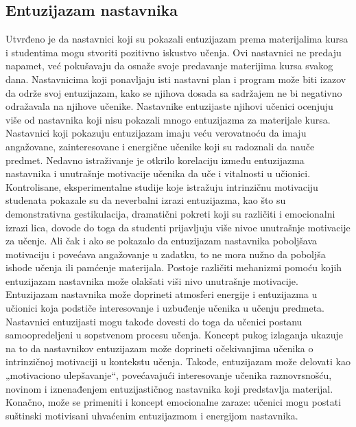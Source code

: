 \documentclass[a4paper]{article}
\begin{document}
\newpage
\subsection{Entuzijazam nastavnika}
Utvrđeno je da nastavnici koji su pokazali entuzijazam prema materijalima kursa i studentima mogu stvoriti pozitivno iskustvo učenja. Ovi nastavnici ne predaju napamet, već pokušavaju da osnaže svoje predavanje materijima kursa svakog dana. Nastavnicima koji ponavljaju isti nastavni plan i program može biti izazov da održe svoj entuzijazam, kako se njihova dosada sa sadržajem ne bi negativno odražavala na njihove učenike. Nastavnike entuzijaste njihovi učenici ocenjuju više od nastavnika koji nisu pokazali mnogo entuzijazma za materijale kursa.
Nastavnici koji pokazuju entuzijazam imaju veću verovatnoću da imaju angažovane, zainteresovane i energične učenike koji su radoznali da nauče predmet. Nedavno istraživanje je otkrilo korelaciju između entuzijazma nastavnika i unutrašnje motivacije učenika da uče i vitalnosti u učionici. Kontrolisane, eksperimentalne studije koje istražuju intrinzičnu motivaciju studenata pokazale su da neverbalni izrazi entuzijazma, kao što su demonstrativna gestikulacija, dramatični pokreti koji su različiti i emocionalni izrazi lica, dovode do toga da studenti prijavljuju više nivoe unutrašnje motivacije za učenje. Ali čak i ako se pokazalo da entuzijazam nastavnika poboljšava motivaciju i povećava angažovanje u zadatku, to ne mora nužno da poboljša ishode učenja ili pamćenje materijala.
Postoje različiti mehanizmi pomoću kojih entuzijazam nastavnika može olakšati viši nivo unutrašnje motivacije. Entuzijazam nastavnika može doprineti atmosferi energije i entuzijazma u učionici koja podstiče interesovanje i uzbuđenje učenika u učenju predmeta. Nastavnici entuzijasti mogu takođe dovesti do toga da učenici postanu samoopredeljeni u sopstvenom procesu učenja. Koncept pukog izlaganja ukazuje na to da nastavnikov entuzijazam može doprineti očekivanjima učenika o intrinzičnoj motivaciji u kontekstu učenja. Takođe, entuzijazam može delovati kao „motivaciono ulepšavanje“, povećavajući interesovanje učenika raznovrsnošću, novinom i iznenađenjem entuzijastičnog nastavnika koji predstavlja materijal. Konačno, može se primeniti i koncept emocionalne zaraze: učenici mogu postati suštinski motivisani uhvaćenim entuzijazmom i energijom nastavnika.
\end{document}
